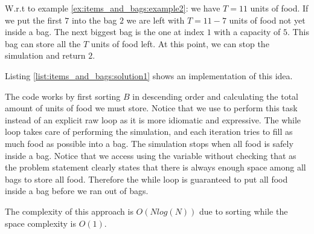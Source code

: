 W.r.t to example \ref{ex:items_and_bags:example2}: we have $T=11$ units of food. If we put the first $7$ into the bag $2$ we are left with $T=11-7$ units of food not yet inside a bag. The next biggest bag is the one at index $1$ with a capacity of $5$. This bag can store all the $T$ units of food left. At this point, we can stop the simulation and return $2$.

Listing \ref{list:items_and_bags:solution1} shows an implementation of this idea.



The code works by first sorting $B$ in descending order and calculating the total amount of units of food we must store. Notice that we use  to perform this task instead of an explicit raw loop as it is more idiomatic and expressive.
The while loop takes care of performing the simulation, and each iteration tries to fill as much food as possible into a bag. The simulation stops when all food is safely inside a bag. 
Notice that we access  using the variable  without checking that  as the problem statement clearly states that there is always enough space among all bags to store all food. Therefore the while loop is guaranteed to put all food inside a bag before we ran out of bags.

The complexity of this approach is $O(Nlog(N))$ due to sorting while the space complexity is $O(1)$.


